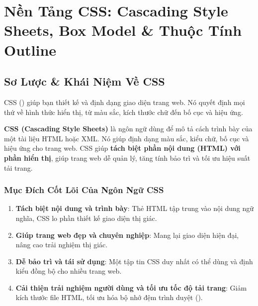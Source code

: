 \chapter{Nền Tảng CSS: Cascading Style Sheets, Box Model \& Thuộc Tính Outline}
\label{chap:css_foundations}

\section{Sơ Lược \& Khái Niệm Về CSS}

CSS () giúp bạn thiết kế và định dạng giao diện trang web. Nó quyết định mọi thứ về hình thức hiển thị, từ màu sắc, kích thước chữ đến bố cục và hiệu ứng.

\begin{conceptBox}
\textbf{CSS (Cascading Style Sheets)} là ngôn ngữ dùng để mô tả cách trình bày của một tài liệu HTML hoặc XML. Nó giúp định dạng màu sắc, kiểu chữ, bố cục và hiệu ứng cho trang web. CSS giúp \textbf{tách biệt phần nội dung (HTML) với phần hiển thị}, giúp trang web dễ quản lý, tăng tính bảo trì và tối ưu hiệu suất tải trang.
\end{conceptBox}

\subsection{Mục Đích Cốt Lõi Của Ngôn Ngữ CSS}
\begin{enumerate}[leftmargin=1.5em, itemsep=4pt, parsep=0pt]
    \item \textbf{Tách biệt nội dung và trình bày}: Thẻ HTML tập trung vào nội dung ngữ nghĩa, CSS lo phần thiết kế giao diện thị giác.
    \item \textbf{Giúp trang web đẹp và chuyên nghiệp}: Mang lại giao diện hiện đại, nâng cao trải nghiệm thị giác.
    \item \textbf{Dễ bảo trì và tái sử dụng}: Một tập tin CSS duy nhất có thể dùng và định kiểu đồng bộ cho nhiều trang web.
    \item \textbf{Cải thiện trải nghiệm người dùng và tối ưu tốc độ tải trang}: Giảm kích thước file HTML, tối ưu hóa bộ nhớ đệm trình duyệt ().
\end{enumerate}

